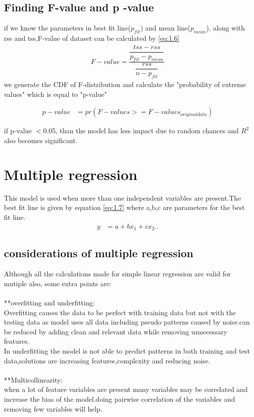 \documentclass{article}
\begin{document}
\subsection{Finding F-value and p -value}
if we know the parameters in best fit line($p_{fit}$) and mean line($p_{mean}$), along with rss and tss,F-value of dataset can be calculated by \eqref{eq:1.6}
\begin{align}
    F-value= \dfrac{\dfrac{tss-rss}{p_{fit}-p_{mean}}}{
    \dfrac{rss}{n-p_{fit}}} \label{eq:1.6}
\end{align}
 we generate the CDF of F-distribution and calculate the "probability of extreme values" which is equal to "p-value"

 \begin{align}
     p-value&=pr(F-values>=F-values_{original data})
 \end{align}

 if p-value $<$0.05, than the model has less impact due to random chances and $R^2$ also becomes significant.
\section{Multiple regression}
 This model is used when more than one independent variables are present.The best fit line  is given by equation \eqref{eq:1.7} where a,b,c are parameters for the best fit line.
\begin{align}
    y&=a+bx_1+cx_2.. \label{eq:1.7}
\end{align}
\subsection{considerations of multiple regression}
Although all the calculations made for simple linear regression are valid for mutiple also, some extra points are:\\\\
**overfitting and underfitting:\\
Overfitting causes the data to be perfect with training data but not with the testing data as model uses all data including pseudo patterns caused by noise.can be reduced by adding clean and relevant data while removing unnecessary features.\\
In underfitting the model is not able to predict patterns in both training and test data,solutions are increasing features,complexity and reducing noise.\\\\
**Multicollinearity:\\
when a lot of feature variables are present many variables may be correlated and increase the bias of the model.doing pairwise correlation of the variables and removing few variables will help.
\end{document}
